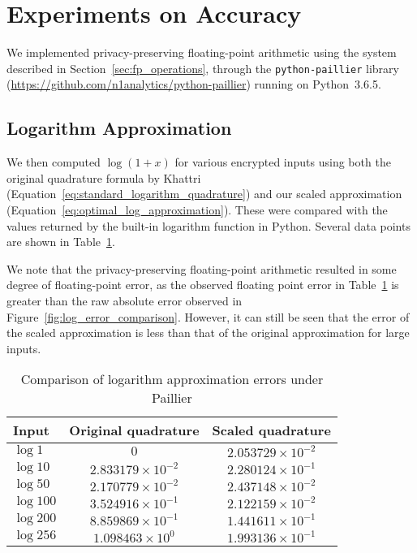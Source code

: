 \section{Experiments on Accuracy}
We implemented privacy-preserving floating-point arithmetic using the system described in Section~\ref{sec:fp_operations}, through the \texttt{python-paillier} library (\url{https://github.com/n1analytics/python-paillier}) running on Python~3.6.5.

\subsection{Logarithm Approximation}
We then computed $\log(1+x)$ for various encrypted inputs using both the original quadrature formula by Khattri (Equation~\ref{eq:standard_logarithm_quadrature}) and our scaled approximation (Equation~\ref{eq:optimal_log_approximation}). These were compared with the values returned by the built-in logarithm function in Python. Several data points are shown in Table~\ref{tab:log_approximation}.

We note that the privacy-preserving floating-point arithmetic resulted in some degree of floating-point error, as the observed floating point error in Table~\ref{tab:log_approximation} is greater than the raw absolute error observed in Figure~\ref{fig:log_error_comparison}. However, it can still be seen that the error of the scaled approximation is less than that of the original approximation for large inputs.
\begin{table}[h]
	\caption{Comparison of logarithm approximation errors under Paillier}
	\label{tab:log_approximation}
	\begin{tabular}{lcc}
		\toprule
		Input & Original quadrature & Scaled quadrature\\
		\midrule
		$\log 1$ & $0$ & $2.053729 \times 10^{-2}$\\
		$\log 10$ & $2.833179 \times 10^{-2} $ & $2.280124 \times 10^{-1}$\\
		$\log 50$ & $2.170779 \times 10^{-2}$ & $2.437148 \times 10^{-2}$\\
		$\log 100$ & $3.524916 \times 10^{-1}$ & $2.122159 \times 10^{-2}$\\
		$\log 200$ & $8.859869 \times 10^{-1}$ & $1.441611 \times 10^{-1}$\\
		$\log 256$ & $1.098463 \times 10^{0}$ & $1.993136 \times 10^{-1}$\\
	\bottomrule
\end{tabular}
\end{table}

